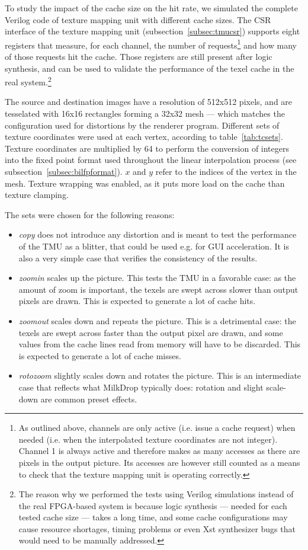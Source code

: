 \documentclass[a4paper,11pt]{kthesis}
\begin{document}
To study the impact of the cache size on the hit rate, we simulated the complete Verilog code of texture mapping unit with different cache sizes. The CSR interface of the texture mapping unit (subsection~\ref{subsec:tmucsr}) supports eight registers that measure, for each channel, the number of requests\footnote{As outlined above, channels are only active (i.e. issue a cache request) when needed (i.e. when the interpolated texture coordinates are not integer). Channel 1 is always active and therefore makes as many accesses as there are pixels in the output picture. Its accesses are however still counted as a means to check that the texture mapping unit is operating correctly.} and how many of those requests hit the cache. Those registers are still present after logic synthesis, and can be used to validate the performance of the texel cache in the real system.\footnote{The reason why we performed the tests using Verilog simulations instead of the real FPGA-based system is because logic synthesis --- needed for each tested cache size --- takes a long time, and some cache configurations may cause resource shortages, timing problems or even Xst synthesizer bugs that would need to be manually addressed.}

The source and destination images have a resolution of 512x512 pixels, and are tesselated with 16x16 rectangles forming a 32x32 mesh --- which matches the configuration used for distortions by the renderer program. Different sets of texture coordinates were used at each vertex, according to table~\ref{tab:tcsets}. Texture coordinates are multiplied by 64 to perform the conversion of integers into the fixed point format used throughout the linear interpolation process (see subsection~\ref{subsec:bilfpformat}). $x$ and $y$ refer to the indices of the vertex in the mesh. Texture wrapping was enabled, as it puts more load on the cache than texture clamping.

The sets were chosen for the following reasons:
\begin{itemize}
\item \textit{copy} does not introduce any distortion and is meant to test the performance of the TMU as a blitter, that could be used e.g. for GUI acceleration. It is also a very simple case that verifies the consistency of the results.
\item \textit{zoomin} scales up the picture. This tests the TMU in a favorable case: as the amount of zoom is important, the texels are swept across slower than output pixels are drawn. This is expected to generate a lot of cache hits.
\item \textit{zoomout} scales down and repeats the picture. This is a detrimental case: the texels are swept across faster than the output pixel are drawn, and some values from the cache lines read from memory will have to be discarded. This is expected to generate a lot of cache misses.
\item \textit{rotozoom} slightly scales down and rotates the picture. This is an intermediate case that reflects what MilkDrop typically does: rotation and slight scale-down are common preset effects.
\end{itemize}
\end{document}
